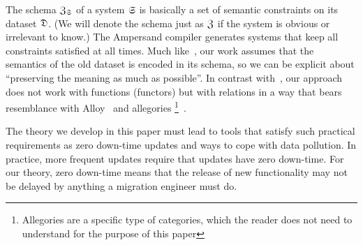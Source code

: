 \documentclass{elsarticle}
\begin{document}
   The schema $\mathfrak{Z}_{\mathfrak{S}}$ of a system $\mathfrak{S}$ is basically a set of semantic constraints on its dataset $\mathfrak{D}$.
   (We will denote the schema just as $\mathfrak{Z}$ if the system is obvious or irrelevant to know.)
   The Ampersand compiler generates systems that keep all constraints satisfied at all times.
   Much like~\cite{Spivak2012}, our work assumes that the semantics of the old dataset is encoded in its schema,
   so we can be explicit about ``preserving the meaning as much as possible''.
   In contrast with~\cite{Spivak2012}, our approach does not work with functions (functors)
   but with relations in a way that bears resemblance with Alloy~\cite{Alloy2006} and allegories%
   \footnote{Allegories are a specific type of categories, which the reader does not need to understand for the purpose of this paper}~\cite{Zielinski2013}.

   The theory we develop in this paper must lead to tools that satisfy such practical requirements as
   zero down-time updates and ways to cope with data pollution.
   In practice, more frequent updates require that updates have zero down-time.
   For our theory, zero down-time means that the release of new functionality may not be delayed by anything a migration engineer must do.
   
\end{document}

